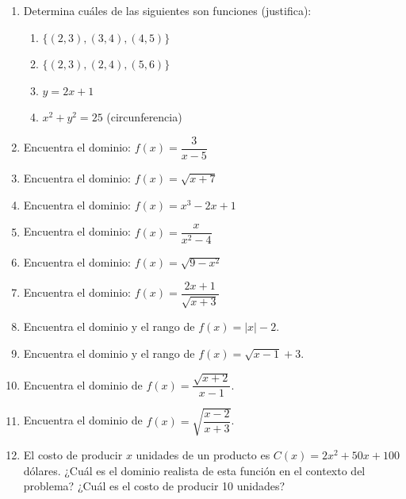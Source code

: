 \documentclass[12pt, letterpaper]{article}
\begin{document}
\begin{enumerate}[resume=ejercicios, leftmargin=*]
  \item \facil{} Determina cuáles de las siguientes son funciones (justifica):
        \begin{enumerate}[label=\alph*)]
          \item $\{(2, 3), (3, 4), (4, 5)\}$
          \item $\{(2, 3), (2, 4), (5, 6)\}$
          \item $y = 2x + 1$
          \item $x^2 + y^2 = 25$ (circunferencia)
        \end{enumerate}

  \item \facil{} Encuentra el dominio: $f(x) = \dfrac{3}{x - 5}$

  \item \facil{} Encuentra el dominio: $f(x) = \sqrt{x + 7}$

  \item \facil{} Encuentra el dominio: $f(x) = x^3 - 2x + 1$

  \item \medio{} Encuentra el dominio: $f(x) = \dfrac{x}{x^2 - 4}$

  \item \medio{} Encuentra el dominio: $f(x) = \sqrt{9 - x^2}$

  \item \medio{} Encuentra el dominio: $f(x) = \dfrac{2x + 1}{\sqrt{x + 3}}$

  \item \medio{} Encuentra el dominio y el rango de $f(x) = |x| - 2$.

  \item \medio{} Encuentra el dominio y el rango de $f(x) = \sqrt{x - 1} + 3$.

  \item \dificil{} Encuentra el dominio de $f(x) = \dfrac{\sqrt{x + 2}}{x - 1}$.

  \item \dificil{} Encuentra el dominio de $f(x) = \sqrt{\dfrac{x - 2}{x + 3}}$.

  \item \dificil{} El costo de producir $x$ unidades de un producto es $C(x) = 2x^2 + 50x + 100$ dólares. ¿Cuál es el dominio realista de esta función en el contexto del problema? ¿Cuál es el costo de producir 10 unidades?
\end{enumerate}
\end{document}
